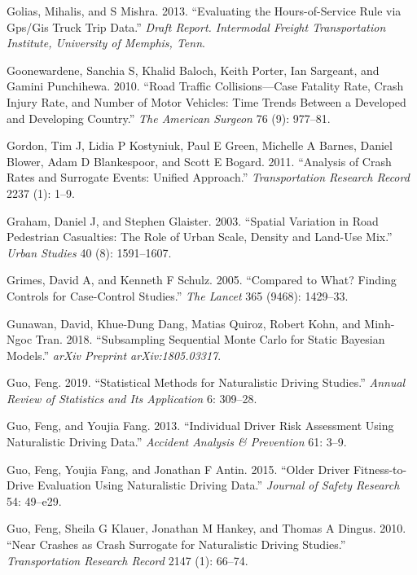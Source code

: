 \documentclass[12pt]{book}
\numberwithin{equation}{chapter}
\begin{document}
\leavevmode\hypertarget{ref-golias2013evaluating}{}%
Golias, Mihalis, and S Mishra. 2013. ``Evaluating the Hours-of-Service Rule via Gps/Gis Truck Trip Data.'' \emph{Draft Report. Intermodal Freight Transportation Institute, University of Memphis, Tenn}.

\leavevmode\hypertarget{ref-goonewardene2010road}{}%
Goonewardene, Sanchia S, Khalid Baloch, Keith Porter, Ian Sargeant, and Gamini Punchihewa. 2010. ``Road Traffic Collisions---Case Fatality Rate, Crash Injury Rate, and Number of Motor Vehicles: Time Trends Between a Developed and Developing Country.'' \emph{The American Surgeon} 76 (9): 977--81.

\leavevmode\hypertarget{ref-gordon2011analysis}{}%
Gordon, Tim J, Lidia P Kostyniuk, Paul E Green, Michelle A Barnes, Daniel Blower, Adam D Blankespoor, and Scott E Bogard. 2011. ``Analysis of Crash Rates and Surrogate Events: Unified Approach.'' \emph{Transportation Research Record} 2237 (1): 1--9.

\leavevmode\hypertarget{ref-graham2003spatial}{}%
Graham, Daniel J, and Stephen Glaister. 2003. ``Spatial Variation in Road Pedestrian Casualties: The Role of Urban Scale, Density and Land-Use Mix.'' \emph{Urban Studies} 40 (8): 1591--1607.

\leavevmode\hypertarget{ref-grimes2005compared}{}%
Grimes, David A, and Kenneth F Schulz. 2005. ``Compared to What? Finding Controls for Case-Control Studies.'' \emph{The Lancet} 365 (9468): 1429--33.

\leavevmode\hypertarget{ref-gunawan2018subsampling}{}%
Gunawan, David, Khue-Dung Dang, Matias Quiroz, Robert Kohn, and Minh-Ngoc Tran. 2018. ``Subsampling Sequential Monte Carlo for Static Bayesian Models.'' \emph{arXiv Preprint arXiv:1805.03317}.

\leavevmode\hypertarget{ref-guo2019statistical}{}%
Guo, Feng. 2019. ``Statistical Methods for Naturalistic Driving Studies.'' \emph{Annual Review of Statistics and Its Application} 6: 309--28.

\leavevmode\hypertarget{ref-guo2013individual}{}%
Guo, Feng, and Youjia Fang. 2013. ``Individual Driver Risk Assessment Using Naturalistic Driving Data.'' \emph{Accident Analysis \& Prevention} 61: 3--9.

\leavevmode\hypertarget{ref-guo2015older}{}%
Guo, Feng, Youjia Fang, and Jonathan F Antin. 2015. ``Older Driver Fitness-to-Drive Evaluation Using Naturalistic Driving Data.'' \emph{Journal of Safety Research} 54: 49--e29.

\leavevmode\hypertarget{ref-guo2010near}{}%
Guo, Feng, Sheila G Klauer, Jonathan M Hankey, and Thomas A Dingus. 2010. ``Near Crashes as Crash Surrogate for Naturalistic Driving Studies.'' \emph{Transportation Research Record} 2147 (1): 66--74.
\end{document}
